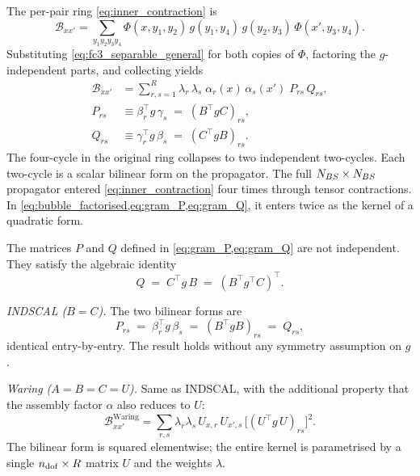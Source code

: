 The per-pair ring \cref{eq:inner_contraction} is
\begin{equation}
  \mathcal{B}_{xx'}
  = \sum_{y_1 y_2 y_3 y_4}
    \Phi(x,y_1,y_2)\,g(y_1,y_4)\,g(y_2,y_3)\,
    \Phi(x',y_3,y_4).
\end{equation}
Substituting \cref{eq:fc3_separable_general} for both copies of
$\Phi$, factoring the $g$-independent parts, and collecting yields
\begin{align}
  \label{eq:bubble_factorised}
  \mathcal{B}_{xx'}
  &= \sum_{r,s=1}^{R} \lambda_r\,\lambda_s\;
      \alpha_r(x)\,\alpha_s(x')\;
      P_{rs}\,Q_{rs},
  \\
  \label{eq:gram_P}
  P_{rs} &\equiv \beta_r^{\!\top} g\,\gamma_s \;=\; (B^{\!\top} g C)_{rs},
  \\
  \label{eq:gram_Q}
  Q_{rs} &\equiv \gamma_r^{\!\top} g\,\beta_s \;=\; (C^{\!\top} g B)_{rs}.
\end{align}
The four-cycle in the original ring collapses to two independent
two-cycles. Each two-cycle is a scalar bilinear form on the
propagator. The full $N_{BS}\times N_{BS}$ propagator entered
\cref{eq:inner_contraction} four times through tensor contractions. In
\cref{eq:bubble_factorised,eq:gram_P,eq:gram_Q}, it enters twice as the
kernel of a quadratic form.

The matrices $P$ and $Q$ defined in \cref{eq:gram_P,eq:gram_Q} are
not independent. They satisfy the algebraic identity
\begin{equation}\label{eq:Q_transpose}
  Q \;=\; C^{\!\top} g\,B \;=\; (B^{\!\top} g^{\!\top} C)^{\!\top}.
\end{equation}

\emph{INDSCAL ($B=C$).} The two bilinear forms are
\begin{equation}\label{eq:P_indscal}
  P_{rs} \;=\; \beta_r^{\!\top} g\,\beta_s
         \;=\; (B^{\!\top} g B)_{rs}
         \;=\; Q_{rs},
\end{equation}
identical entry-by-entry. The result holds without any symmetry
assumption on $g$.

\emph{Waring ($A=B=C=U$).} Same as INDSCAL, with the additional
property that the assembly factor $\alpha$ also reduces to $U$:
\begin{equation}\label{eq:bubble_waring}
  \mathcal{B}_{xx'}^{\mathrm{Waring}}
  = \sum_{r,s} \lambda_r \lambda_s\,U_{x,r}\,U_{x',s}\,
      \bigl[(U^{\!\top} g\,U)_{rs}\bigr]^{2}.
\end{equation}
The bilinear form is squared elementwise; the entire kernel is
parametrised by a single $n_{\mathrm{dof}}\times R$ matrix $U$ and the weights
$\lambda$.

